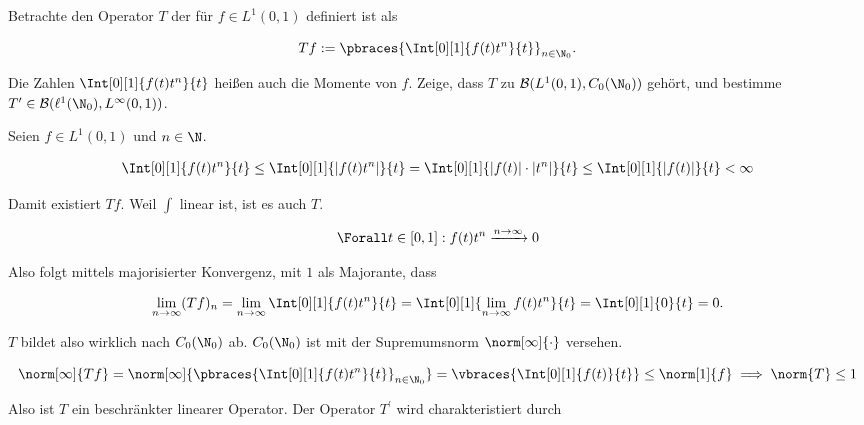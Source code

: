\begin{exercise}[18/1]

Betrachte den Operator $T$ der für $f \in L^1(0, 1)$ definiert ist als

\begin{align*}
  T f
  :=
  \pbraces{\Int[0][1]{f(t) t^n}{t}}_{n \in \N_0}.
\end{align*}

Die Zahlen $\Int[0][1]{f(t) t^n}{t}$ heißen auch die Momente von $f$.
Zeige, dass $T$ zu $\mathcal{B}(L^1(0, 1), C_0(\N_0))$ gehört, und bestimme $T^\prime \in \mathcal{B}(\ell^1(\N_0), L^\infty(0, 1))$.

\end{exercise}

\begin{solution}

Seien $f \in L^1(0, 1)$ und $ n \in \N$.

\begin{align*}
  \Int[0][1]{f(t)t^n}{t}
  \leq
  \Int[0][1]{|f(t) t^n|}{t}
  =
  \Int[0][1]{|f(t)| \cdot |t^n|}{t}
  \leq
  \Int[0][1]{|f(t)|}{t} < \infty
\end{align*}

Damit existiert $Tf$.
Weil $\int$ linear ist, ist es auch $T$.

\begin{align*}
  \Forall t \in [0, 1]:
  f(t) t^n
  \xrightarrow{n \to \infty} 0
\end{align*}

Also folgt mittels majorisierter Konvergenz, mit $1$ als Majorante, dass

\begin{align*}
  \lim_{n \to \infty}
  (T f)_n
  =
  \lim_{n \to \infty}
  \Int[0][1]{f(t) t^n}{t}
  =
  \Int[0][1]{\lim_{n \to \infty} f(t) t^n}{t}
  =
  \Int[0][1]{0}{t} = 0.
\end{align*}

$T$ bildet also wirklich nach $C_0(\N_0)$ ab.
$C_0(\N_0)$ ist mit der Supremumsnorm $\norm[\infty]{\cdot}$ versehen.

\begin{align*}
  \norm[\infty]{T f}
  =
  \norm[\infty]
  {\pbraces{\Int[0][1]{f(t) t^n}{t}}_{n \in \N_0}}
  =
  \vbraces{\Int[0][1]{f(t)}{t}}
  \leq
  \norm[1]{f}
  \implies
  \norm{T} \leq 1
\end{align*}

Also ist $T$ ein beschränkter linearer Operator.
Der Operator $T^\prime$ wird charakteristiert durch


\end{solution}
